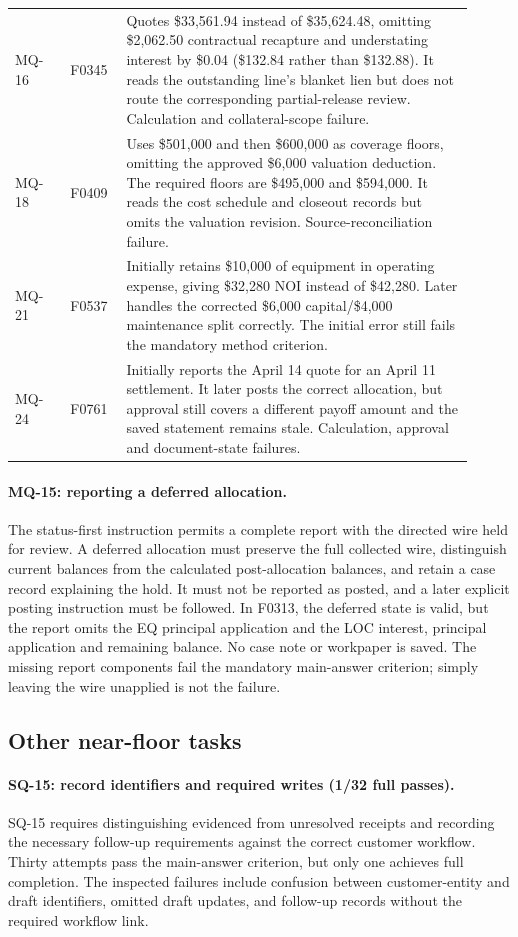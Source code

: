 {\begin{longtable}{@{}p{0.11\linewidth}p{0.11\linewidth}p{0.69\linewidth}@{}}
MQ-16 & F0345 & Quotes \$33,561.94 instead of \$35,624.48, omitting \$2,062.50 contractual recapture and understating interest by \$0.04 (\$132.84 rather than \$132.88). It reads the outstanding line's blanket lien but does not route the corresponding partial-release review. Calculation and collateral-scope failure.\\\addlinespace
MQ-18 & F0409 & Uses \$501,000 and then \$600,000 as coverage floors, omitting the approved \$6,000 valuation deduction. The required floors are \$495,000 and \$594,000. It reads the cost schedule and closeout records but omits the valuation revision. Source-reconciliation failure.\\\addlinespace
MQ-21 & F0537 & Initially retains \$10,000 of equipment in operating expense, giving \$32,280 NOI instead of \$42,280. Later handles the corrected \$6,000 capital/\$4,000 maintenance split correctly. The initial error still fails the mandatory method criterion.\\\addlinespace
MQ-24 & F0761 & Initially reports the April 14 quote for an April 11 settlement. It later posts the correct allocation, but approval still covers a different payoff amount and the saved statement remains stale. Calculation, approval and document-state failures.\\\bottomrule
\end{longtable}}

\paragraph{MQ-15: reporting a deferred allocation.}
The status-first instruction permits a complete report with the directed wire held for review. A deferred allocation must preserve the full collected wire, distinguish current balances from the calculated post-allocation balances, and retain a case record explaining the hold. It must not be reported as posted, and a later explicit posting instruction must be followed. In F0313, the deferred state is valid, but the report omits the EQ principal application and the LOC interest, principal application and remaining balance. No case note or workpaper is saved. The missing report components fail the mandatory main-answer criterion; simply leaving the wire unapplied is not the failure.

\subsection{Other near-floor tasks}
\paragraph{SQ-15: record identifiers and required writes (1/32 full passes).}
SQ-15 requires distinguishing evidenced from unresolved receipts and recording the necessary follow-up requirements against the correct customer workflow. Thirty attempts pass the main-answer criterion, but only one achieves full completion. The inspected failures include confusion between customer-entity and draft identifiers, omitted draft updates, and follow-up records without the required workflow link.

